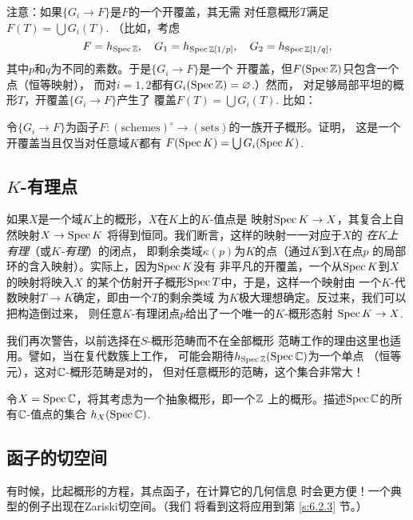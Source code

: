 注意：如果$\{G_i\to F\}$是$F$的一个开覆盖，其无需
对任意概形$T$满足$F(T)=\bigcup G_i(T)$. （比如，考虑
\[
	F=h_{\operatorname{Spec} \mathbb{Z}},\quad G_1=h_{\operatorname{Spec} \mathbb{Z}[1/p]},
	\quad G_2=h_{\operatorname{Spec} \mathbb{Z}[1/q]},
\]
其中$p$和$q$为不同的素数。于是$\{G_i\to F\}$是一个
开覆盖，但$F(\operatorname{Spec} \mathbb{Z})$只包含一个点（恒等映射），
而对$i=1,2$都有$G_i(\operatorname{Spec} \mathbb{Z})=\varnothing$.）然而，
对足够局部平坦的概形$T$，开覆盖$\{G_i\to F\}$产生了
覆盖$F(T)=\bigcup G_i(T)$. 比如：


\begin{exe} \label{exe:6.11}
	令$\{G_i\to F\}$为函子$F:(\text{schemes})^\circ
	\to (\text{sets})$的一族开子概形。证明，
	这是一个开覆盖当且仅当对任意域$K$都有
	$F(\operatorname{Spec} K)=\bigcup G_i(\operatorname{Spec} K)$.
\end{exe}

\subsection{\texorpdfstring{$K$}{K}-有理点}
\label{s:6.1.2}

如果$X$是一个域$K$上的概形，$X$在$K$上的$K$-值点是
映射$\operatorname{Spec} K\to X$，其复合上自然映射$X\to \operatorname{Spec} K$
将得到恒同。我们断言，这样的映射一一对应于$X$的
\textit{在$K$上有理}（或\textit{$K$-有理}）的闭点，
即剩余类域$\kappa(p)$为$K$的点（通过$K$到$X$在点$p$
的局部环的含入映射）。实际上，因为$\operatorname{Spec} K$没有
非平凡的开覆盖，一个从$\operatorname{Spec} K$到$X$的映射将映入$X$
的某个仿射开子概形$\operatorname{Spec} T$中，于是，这样一个映射由
一个$K$-代数映射$T\to K$确定，即由一个$T$的剩余类域
为$K$极大理想确定。反过来，我们可以把构造倒过来，
则任意$K$-有理闭点$p$给出了一个唯一的$K$-概形态射
$\operatorname{Spec} K\to X$.

我们再次警告，以前选择在$S$-概形范畴而不在全部概形
范畴工作的理由这里也适用。譬如，当在复代数簇上工作，
可能会期待$h_{\operatorname{Spec} \mathbb{Z}}(\operatorname{Spec} \mathbb{C})$为一个单点
（恒等元），这对$\mathbb{C}$-概形范畴是对的，
但对任意概形的范畴，这个集合非常大！

\begin{exe}\label{exe:6.12}
令$X=\operatorname{Spec} \mathbb{C}$，将其考虑为一个抽象概形，即一个$\mathbb{Z}$
上的概形。描述$\operatorname{Spec} \mathbb{C}$的所有$\mathbb{C}$-值点的集合
$h_X(\operatorname{Spec} \mathbb{C})$.
\end{exe}

\subsection{函子的切空间} \label{s:6.1.3}

有时候，比起概形的方程，其点函子，在计算它的几何信息
时会更方便！一个典型的例子出现在Zariski切空间。（我们
将看到这将应用到第 \ref{s:6.2.3} 节。）

